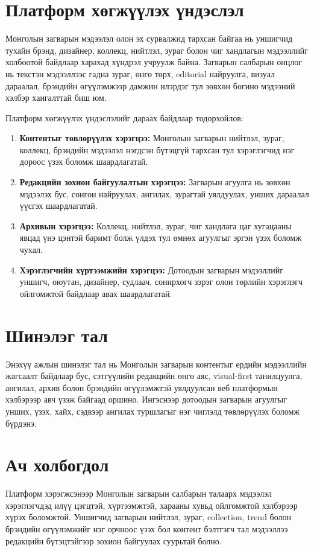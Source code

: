 \section*{Платформ хөгжүүлэх үндэслэл}
Монголын загварын мэдээлэл олон эх сурвалжид тархсан байгаа нь уншигчид тухайн брэнд, дизайнер, коллекц, нийтлэл, зураг болон чиг хандлагын мэдээллийг холбоотой байдлаар харахад хүндрэл учруулж байна. Загварын салбарын онцлог нь текстэн мэдээллээс гадна зураг, өнгө төрх, editorial найруулга, визуал дараалал, брэндийн өгүүлэмжээр дамжин илэрдэг тул зөвхөн богино мэдээний хэлбэр хангалттай биш юм.

Платформ хөгжүүлэх үндэслэлийг дараах байдлаар тодорхойлов:
\begin{enumerate}
    \item \textbf{Контентыг төвлөрүүлэх хэрэгцээ:} Монголын загварын нийтлэл, зураг, коллекц, брэндийн мэдээлэл нэгдсэн бүтэцгүй тархсан тул хэрэглэгчид нэг дороос үзэх боломж шаардлагатай.
    \item \textbf{Редакцийн зохион байгуулалтын хэрэгцээ:} Загварын агуулга нь зөвхөн мэдээлэх бус, сонгон найруулах, ангилах, зурагтай уялдуулах, унших дараалал үүсгэх шаардлагатай.
    \item \textbf{Архивын хэрэгцээ:} Коллекц, нийтлэл, зураг, чиг хандлага цаг хугацааны явцад үнэ цэнтэй баримт болж үлдэх тул өмнөх агуулгыг эргэн үзэх боломж чухал.
    \item \textbf{Хэрэглэгчийн хүртээмжийн хэрэгцээ:} Дотоодын загварын мэдээллийг уншигч, оюутан, дизайнер, судлаач, сонирхогч зэрэг олон төрлийн хэрэглэгч ойлгомжтой байдлаар авах шаардлагатай.
\end{enumerate}

\section*{Шинэлэг тал}
Энэхүү ажлын шинэлэг тал нь Монголын загварын контентыг ердийн мэдээллийн жагсаалт байдлаар бус, сэтгүүлийн редакцийн өнгө аяс, visual-first танилцуулга, ангилал, архив болон брэндийн өгүүлэмжтэй уялдуулсан веб платформын хэлбэрээр авч үзэж байгаад оршино. Ингэснээр дотоодын загварын агуулгыг унших, үзэх, хайх, сэдвээр ангилах туршлагыг нэг чиглэлд төвлөрүүлэх боломж бүрдэнэ.

\section*{Ач холбогдол}
Платформ хэрэгжсэнээр Монголын загварын салбарын талаарх мэдээлэл хэрэглэгчдэд илүү цэгцтэй, хүртээмжтэй, харааны хувьд ойлгомжтой хэлбэрээр хүрэх боломжтой. Уншигчид загварын нийтлэл, зураг, collection, trend болон брэндийн өгүүлэмжийг нэг орчноос үзэх бол контент бэлтгэгч тал мэдээллээ редакцийн бүтэцтэйгээр зохион байгуулах суурьтай болно.

